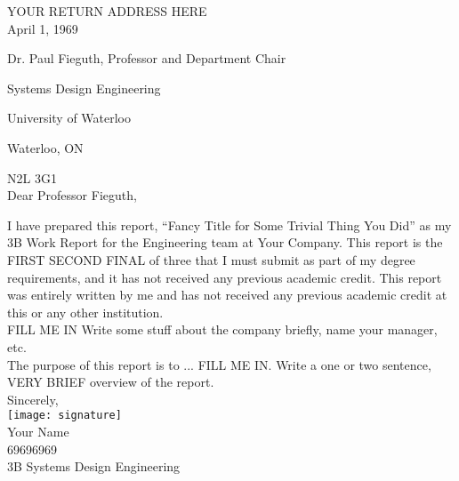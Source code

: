 \documentclass[12pt]{article}
\title{\reportTitle}
\author{\studentName}
\date{\reportDueDate}
\def\reportTitle{Fancy Title for Some Trivial Thing You Did}
\def\studentName{Your Name}
\def\studentNumber{69696969}
\def\company{Your Company}
\begin{document}
    
    \startindent
	\makewtrtitle
	\stopindent
	
	
	\begin{singlespace}

		YOUR RETURN ADDRESS HERE \\

    	April 1, 1969

		Dr. Paul Fieguth, Professor and Department Chair
	
		Systems Design Engineering
	
	    University of Waterloo
	
	    Waterloo, ON
	
	    N2L 3G1\\
	
		Dear Professor Fieguth,
	\end{singlespace}
    
        I have prepared this report, “\reportTitle” as my 3B Work Report for the Engineering team at \company. This report is the FIRST SECOND FINAL of three that I must submit as part of my degree requirements, and it has not received any previous academic credit. This report was entirely written by me and has not received any previous academic credit at this or any other institution.\\
    	
    	FILL ME IN Write some stuff about the company briefly, name your manager, etc. \\
    	
    	The purpose of this report is to ... FILL ME IN. Write a one or two sentence, VERY BRIEF overview of the report. \\


	    \noindent
	    Sincerely,\\
	    \texttt{[image: signature]}\\
    	
    	\studentName \\
    	\studentNumber \\
        3B Systems Design Engineering

	\newpage


	\begin{abstract}
	    Fuck report styling. That is all.
	\end{abstract}


	\tableofcontents
\end{document}
